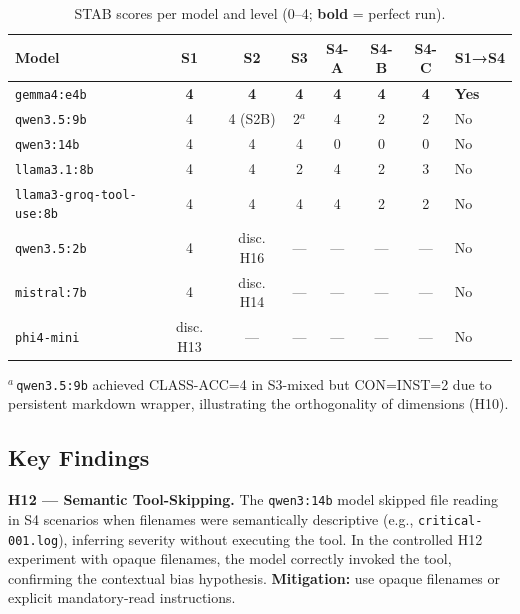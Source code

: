 \documentclass{kdmile}
\begin{document}
\begin{table}[H]
\centering
\caption{STAB scores per model and level (0--4; \textbf{bold} = perfect run).}
\label{tab:results}
\begin{tabular}{lccccccl}
\toprule
\textbf{Model} & \textbf{S1} & \textbf{S2} & \textbf{S3} & \textbf{S4-A} & \textbf{S4-B} & \textbf{S4-C} & \textbf{S1→S4} \\
\midrule
\texttt{gemma4:e4b}              & \textbf{4} & \textbf{4} & \textbf{4} & \textbf{4} & \textbf{4} & \textbf{4} & \textbf{Yes} \\
\texttt{qwen3.5:9b}              & 4 & 4 (S2B) & 2$^a$ & 4 & 2 & 2 & No \\
\texttt{qwen3:14b}               & 4 & 4 & 4 & 0 & 0 & 0 & No \\
\texttt{llama3.1:8b}             & 4 & 4 & 2 & 4 & 2 & 3 & No \\
\texttt{llama3-groq-tool-use:8b} & 4 & 4 & 4 & 4 & 2 & 2 & No \\
\texttt{qwen3.5:2b}              & 4 & disc. H16 & --- & --- & --- & --- & No \\
\texttt{mistral:7b}              & 4 & disc. H14 & --- & --- & --- & --- & No \\
\texttt{phi4-mini}               & disc. H13 & --- & --- & --- & --- & --- & No \\
\bottomrule
\end{tabular}
\begin{minipage}{\linewidth}
\vspace{2pt}
\footnotesize
$^a$\,\texttt{qwen3.5:9b} achieved CLASS-ACC=4 in S3-mixed but CON=INST=2 due to
persistent markdown wrapper, illustrating the orthogonality of dimensions (H10).
\end{minipage}
\end{table}

\subsection{Key Findings}

\textbf{H12 — Semantic Tool-Skipping.}
The \texttt{qwen3:14b} model skipped file reading in S4 scenarios when filenames
were semantically descriptive (e.g., \texttt{critical-001.log}), inferring
severity without executing the tool. In the controlled H12 experiment with
opaque filenames, the model correctly invoked the tool, confirming the
contextual bias hypothesis. \textbf{Mitigation:} use opaque filenames or
explicit mandatory-read instructions.
\end{document}
